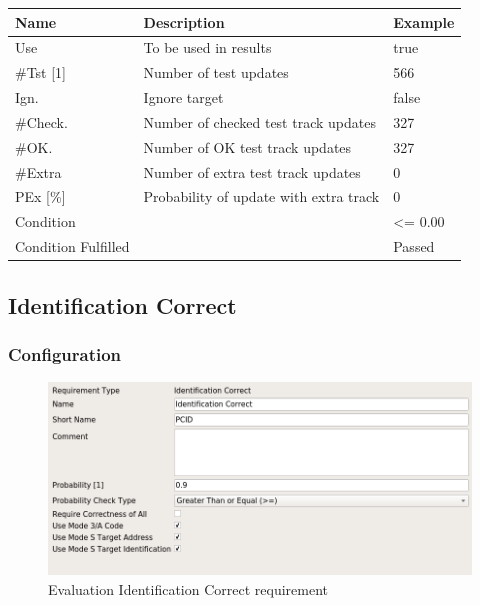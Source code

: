 \begin{center}
 \begin{table}[H]
  \begin{tabularx}{\textwidth}{ | l | X |  l | }
    \hline
    \textbf{Name} & \textbf{Description} & \textbf{Example} \\ \hline
    Use & To be used in results & true \\ \hline
    \#Tst [1] & Number of test updates & 566 \\ \hline
    Ign. & Ignore target & false \\ \hline
    \#Check. & Number of checked test track updates & 327 \\ \hline
    \#OK. & Number of OK test track updates & 327 \\ \hline
    \#Extra & Number of extra test track updates & 0 \\ \hline
    PEx [\%] & Probability of update with extra track & 0 \\ \hline
    Condition &  & <= 0.00 \\ \hline
    Condition Fulfilled &  & Passed \\ \hline
\end{tabularx}
\end{table}
\end{center}


\subsection{Identification Correct}
\label{sec:eval_req_id_correct} 

\subsubsection{Configuration}

\begin{figure}[H]
    \includegraphics[width=14cm,frame]{figures/eval_req_id_correct.png}
  \caption{Evaluation Identification Correct requirement}
\end{figure}

